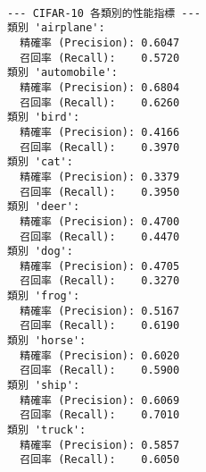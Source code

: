 \documentclass[11pt]{article}
\begin{document}
    \begin{Verbatim}[commandchars=\\\{\}]

--- CIFAR-10 各類別的性能指標 ---
類別 'airplane':
  精確率 (Precision): 0.6047
  召回率 (Recall):    0.5720
類別 'automobile':
  精確率 (Precision): 0.6804
  召回率 (Recall):    0.6260
類別 'bird':
  精確率 (Precision): 0.4166
  召回率 (Recall):    0.3970
類別 'cat':
  精確率 (Precision): 0.3379
  召回率 (Recall):    0.3950
類別 'deer':
  精確率 (Precision): 0.4700
  召回率 (Recall):    0.4470
類別 'dog':
  精確率 (Precision): 0.4705
  召回率 (Recall):    0.3270
類別 'frog':
  精確率 (Precision): 0.5167
  召回率 (Recall):    0.6190
類別 'horse':
  精確率 (Precision): 0.6020
  召回率 (Recall):    0.5900
類別 'ship':
  精確率 (Precision): 0.6069
  召回率 (Recall):    0.7010
類別 'truck':
  精確率 (Precision): 0.5857
  召回率 (Recall):    0.6050
    \end{Verbatim}
\end{document}
